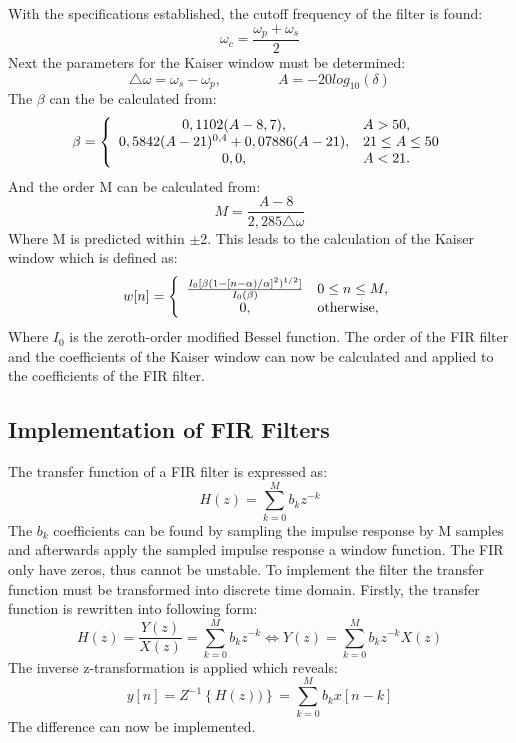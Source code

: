 With the specifications established, the cutoff frequency of the filter is found:
\begin{equation}
\omega_c=\frac{\omega_p+\omega_s}{2}
\end{equation}
Next the parameters for the Kaiser window must be determined:
\begin{equation}
\triangle\omega = \omega_s-\omega_p, \qquad\qquad A=-20log_{10}(\delta)
\end{equation}
The $\beta$ can the be calculated from:
\begin{equation} \label{eq:beta}
\beta=\left\{
\begin{array}{c l}      
    0,1102(A-8,7), & A>50,\\
    0,5842(A-21)^{0,4}+0,07886(A-21), & 21\leq A\leq 50\\
    0,0, & A<21.
\end{array}\right.
\end{equation}
And the order M can be calculated from:
\begin{equation}
M=\frac{A-8}{2,285\triangle\omega}
\end{equation}
Where M is predicted within $\pm$2. This leads to the calculation of the Kaiser window which is defined as:
\begin{equation} \label{eq:kaiserwindow}
w[n]=\left\{
\begin{array}{c l}      
    \frac{I_0[\beta(1-[n-\alpha)/\alpha]^2)^{1/2}]}{I_0(\beta)} & 0\leq n\leq M,\\
    0, & \textrm{otherwise},
\end{array}\right.
\end{equation}
Where $I_0$ is the zeroth-order modified Bessel function. The order of the FIR filter and the coefficients of the Kaiser window can now be calculated and applied to the coefficients of the FIR filter.

\subsection*{Implementation of FIR Filters}

The transfer function of a FIR filter is expressed as:
\begin{equation}
H(z) = \sum_{k=0}^{M} b_k z^{-k}
\end{equation}
The $b_k$ coefficients can be found by sampling the impulse response by M samples and afterwards apply the sampled impulse response a window function. The FIR only have zeros, thus cannot be unstable. To implement the filter the transfer function must be transformed into discrete time domain. Firstly, the transfer function is rewritten into following form:
\begin{equation}
H(z) = \frac{Y(z)}{X(z)} = \sum_{k=0}^{M} b_k z^{-k} \Leftrightarrow Y(z) = \sum_{k=0}^{M} b_k z^{-k} X(z) 
\end{equation}
The inverse z-transformation is applied which reveals:
\begin{equation}
y[n] = Z^{-1} \left\lbrace H(z)) \right\rbrace =\sum_{k=0}^{M} b_k x[n-k]
\end{equation}
The difference can now be implemented.



